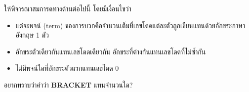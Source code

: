 \question{}

ให้พิจารณาสมการดทางด้านต่อไปนี้ โดยมีเงื่อนไขว่า

\begin{itemize}
\item แต่จะพจน์ (term) ของการบวกคือจำนวนเต็มที่เลขโดดแต่ละตัวถูกเขียนแทนด้วยอักขระภาษาอังกฤษ 1 ตัว
\item อักขระตัวเดียวกันแทนเลขโดดเดียวกัน อักขระที่ต่างกันแทนเลขโดดที่ไม่ซ้ำกัน
\item ไม่มีพจน์ใดที่อักขระตัวแรกแทนเลขโดด 0
\end{itemize}

\noindent
อยากทราบว่าคำว่า \textbf{\ltspc BRACKET} แทนจำนวนใด?
